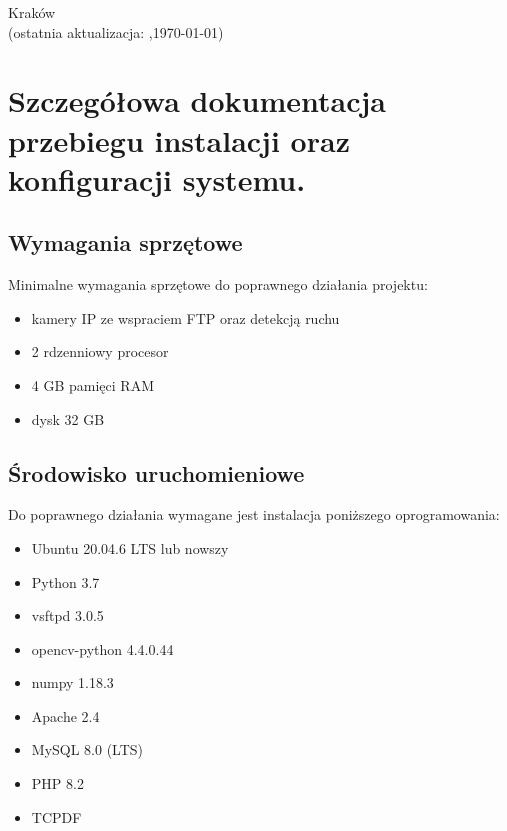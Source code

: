 \documentclass[12pt,a4paper,oneside]{article}
\theoremstyle{definition}
\numberwithin{equation}{section}
\begin{document}
\begin{titlepage}
\vspace*{\fill}
\begin{center}
\large
Kraków \the\year\\
(ostatnia aktualizacja: \DTMcurrenttime,\;\today)
\end{center}
\end{titlepage}
\setcounter{page}{0} 
\newpage\null\thispagestyle{empty}

\tableofcontents


\newpage

\section{Szczegółowa dokumentacja przebiegu instalacji oraz konfiguracji systemu.}
\subsection{Wymagania sprzętowe}
Minimalne wymagania sprzętowe do poprawnego działania projektu:
\begin{itemize}
  \item  kamery IP ze wspraciem FTP oraz detekcją ruchu  
  \item  2 rdzenniowy procesor 
  \item  4 GB pamięci RAM 
  \item  dysk 32 GB
\end{itemize}
\subsection{Środowisko uruchomieniowe}
Do poprawnego działania wymagane jest instalacja poniższego oprogramowania:
\begin{itemize}
  \item  Ubuntu 20.04.6 LTS lub nowszy
  \item  Python 3.7
  \item  vsftpd 3.0.5
  \item  opencv-python 4.4.0.44
  \item  numpy 1.18.3
  \item  Apache 2.4
  \item  MySQL 8.0 (LTS)
  \item  PHP 8.2
  \item  TCPDF
\end{itemize}
\end{document}

